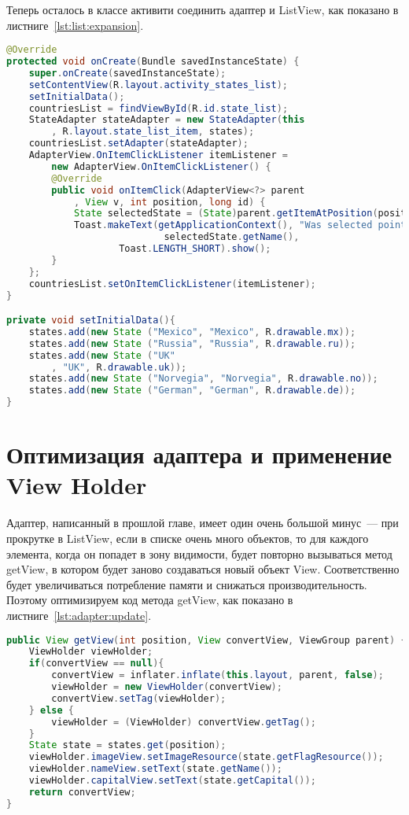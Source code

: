 Теперь осталось в классе активити соединить адаптер и ListView,
как показано в листниге~\ref{lst:list:expansion}.
\begin{lstlisting}[language=Java
	, label=lst:list:expansion
	]
@Override
protected void onCreate(Bundle savedInstanceState) {
	super.onCreate(savedInstanceState);
	setContentView(R.layout.activity_states_list);
	setInitialData();
	countriesList = findViewById(R.id.state_list);
	StateAdapter stateAdapter = new StateAdapter(this
		, R.layout.state_list_item, states);
	countriesList.setAdapter(stateAdapter);
	AdapterView.OnItemClickListener itemListener =
		new AdapterView.OnItemClickListener() {
		@Override
		public void onItemClick(AdapterView<?> parent
			, View v, int position, long id) {
			State selectedState = (State)parent.getItemAtPosition(position);
			Toast.makeText(getApplicationContext(), "Was selected point " +
							selectedState.getName(),
					Toast.LENGTH_SHORT).show();
		}
	};
	countriesList.setOnItemClickListener(itemListener);
}

private void setInitialData(){
	states.add(new State ("Mexico", "Mexico", R.drawable.mx));
	states.add(new State ("Russia", "Russia", R.drawable.ru));
	states.add(new State ("UK"
		, "UK", R.drawable.uk));
	states.add(new State ("Norvegia", "Norvegia", R.drawable.no));
	states.add(new State ("German", "German", R.drawable.de));
}
\end{lstlisting}

\section{Оптимизация адаптера и применение View Holder}
Адаптер, написанный в прошлой главе, имеет один очень большой минус~---
при прокрутке в ListView, если в списке очень много объектов,
то для каждого элемента,
когда он попадет в зону видимости, будет повторно вызываться метод
getView, в котором будет заново создаваться новый объект View.
Соответственно будет увеличиваться потребление памяти и снижаться
производительность. Поэтому оптимизируем код метода getView,
как показано в листниге~\ref{lst:adapter:update}.

\begin{lstlisting}[language=Java
	, label=lst:adapter:update
	]
public View getView(int position, View convertView, ViewGroup parent) {
	ViewHolder viewHolder;
	if(convertView == null){
		convertView = inflater.inflate(this.layout, parent, false);
		viewHolder = new ViewHolder(convertView);
		convertView.setTag(viewHolder);
	} else {
		viewHolder = (ViewHolder) convertView.getTag();
	}
	State state = states.get(position);
	viewHolder.imageView.setImageResource(state.getFlagResource());
	viewHolder.nameView.setText(state.getName());
	viewHolder.capitalView.setText(state.getCapital());
	return convertView;
}
\end{lstlisting}

